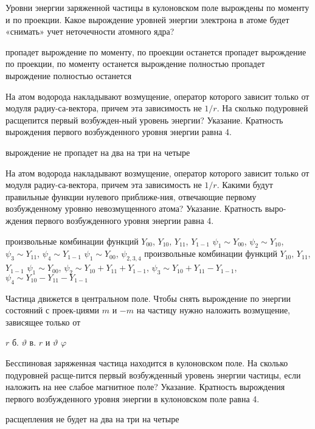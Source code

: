 \documentclass[11pt,a4paper]{exam}
\begin{document}
\begin{questions}
\question Уровни энергии заряженной частицы в кулоновском поле вырождены по моменту и по проекции. Какое вырождение уровней энергии электрона в атоме будет «снимать» учет неточечности атомного ядра?
\begin{choices}
\choice пропадет вырождение по моменту, по проекции останется 
\choice пропадет вырождение по проекции, по моменту останется
\choice вырождение полностью пропадет
\choice вырождение полностью останется
\end{choices}

\question На атом водорода накладывают возмущение, оператор которого зависит только от модуля радиу-са-вектора, причем эта зависимость не $1/r$. На сколько подуровней расщепится первый возбужден-ный уровень энергии? Указание. Кратность вырождения первого возбужденного уровня энергии равна 4.
\begin{choices}
\choice вырождение не пропадет     
\choice на два
\choice на три            
\choice на четыре
\end{choices}

\question На атом водорода накладывают возмущение, оператор которого зависит только от модуля радиу-са-вектора, причем эта зависимость не $1/r$. Какими будут правильные функции нулевого приближе-ния, отвечающие первому возбужденному уровню невозмущенного атома? Указание. Кратность выро-ждения первого возбужденного уровня энергии равна 4.
\begin{choices}
\choice произвольные комбинации функций ${Y_{00}}$,  ${Y_{10}}$, ${Y_{11}}$, ${Y_{1 - 1}}$
\choice ${\psi _1} \sim {Y_{00}}$, ${\psi _2} \sim {Y_{10}}$, ${\psi _3} \sim {Y_{11}}$, ${\psi _4} \sim {Y_{1 - 1}}$
\choice ${\psi _1} \sim {Y_{00}}$, ${\psi _{2,3,4}}$ произвольные комбинации функций ${Y_{10}}$, ${Y_{11}}$, ${Y_{1 - 1}}$
\choice ${\psi _1} \sim {Y_{00}}$, ${\psi _2} \sim {Y_{10}} + {Y_{11}} + {Y_{1 - 1}}$, ${\psi _3} \sim {Y_{10}} + {Y_{11}} - {Y_{1 - 1}}$, ${\psi _4} \sim {Y_{10}} - {Y_{11}} - {Y_{1 - 1}}$
\end{choices}

\question Частица движется в центральном поле. Чтобы снять вырождение по энергии состояний с проек-циями $m$ и $ - m$ на частицу нужно наложить возмущение, зависящее только от
\begin{choices}
\choice $r$      б. $\vartheta $      в. $r$ и $\vartheta $      
\choice $\varphi $
\end{choices}

\question Бесспиновая заряженная частица находится в кулоновском поле. На сколько подуровней расще-пится первый возбужденный уровень энергии частицы, если наложить на нее слабое магнитное поле? Указание. Кратность вырождения первого возбужденного уровня энергии в кулоновском поле равна 4.
\begin{choices}
\choice расщепления не будет    
\choice на два
\choice на три            
\choice на четыре
\end{choices}

\end{questions}
\end{document}
